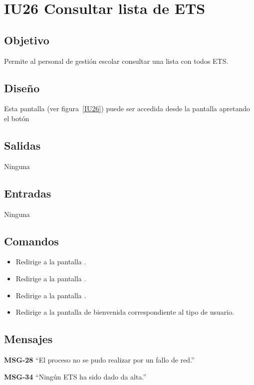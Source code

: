 
\section{IU26 Consultar lista de ETS}
\subsection{Objetivo}
    Permite al personal de gestión escolar consultar una lista con todos ETS.
\subsection{Diseño}
    Esta pantalla  (ver figura~\ref{IU26}) puede ser accedida desde la pantalla  apretando el botón 

\subsection{Salidas}
Ninguna
\subsection{Entradas}
Ninguna
\subsection{Comandos}
\begin{itemize}
    \item {} Redirige a la pantalla .
    \item {} Redirige a la pantalla .
    \item {} Redirige a la pantalla .
    \item {} Redirige a la pantalla de bienvenida correspondiente al tipo de usuario.
    
\end{itemize}

\subsection{Mensajes}

\begin{Citemize}
    \item {\bf MSG-28}  ``El proceso no se pudo realizar por un fallo de red.''
    \item {\bf MSG-34}  ``Ningún ETS ha sido dado da alta.''
\end{Citemize}

